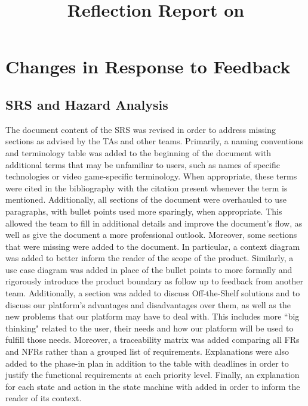 \documentclass[12pt, titlepage]{article}
\title{Reflection Report on \progname{}}
\author{\authname}
\date{}
\begin{document}
\maketitle

\section{Changes in Response to Feedback}

\subsection{SRS and Hazard Analysis}
The document content of the SRS was revised in order to address missing sections as advised by the TAs and other teams. Primarily, a naming conventions and terminology table was added to the beginning of the document with additional terms that may be unfamiliar to users, such as names of specific technologies or video game-specific terminology. When appropriate, these terms were cited in the bibliography with the citation present whenever the term is mentioned. Additionally, all sections of the document were overhauled to use paragraphs, with bullet points used more sparingly, when appropriate. This allowed the team to fill in additional details and improve the document's flow, as well as give the document a more professional outlook. Moreover, some sections that were missing were added to the document. In particular, a context diagram was added to better inform the reader of the scope of the product. Similarly, a use case diagram was added in place of the bullet points to more formally and rigorously introduce the product boundary as follow up to feedback from another team. Additionally, a section was added to discuss Off-the-Shelf solutions and to discuss our platform's advantages and disadvantages over them, as well as the new problems that our platform may have to deal with. This includes more ``big thinking" related to the user, their needs and how our platform will be used to fulfill those needs. Moreover, a traceability matrix was added comparing all FRs and NFRs rather than a grouped list of requirements. Explanations were also added to the phase-in plan in addition to the table with deadlines in order to justify the functional requirements at each priority level. Finally, an explanation for each state and action in the state machine with added in order to inform the reader of its context. 
\end{document}
